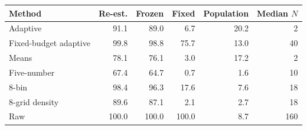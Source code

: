 \begin{tabular}{lrrrrr}\toprule Method & Re-est. & Frozen & Fixed & Population & Median $N$\\\midrule
Adaptive & 91.1 & 89.0 & 6.7 & 20.2 & 2\\
Fixed-budget adaptive & 99.8 & 98.8 & 75.7 & 13.0 & 40\\
Means & 78.1 & 76.1 & 3.0 & 17.2 & 2\\
Five-number & 67.4 & 64.7 & 0.7 & 1.6 & 10\\
8-bin & 98.4 & 96.3 & 17.6 & 7.6 & 18\\
8-grid density & 89.6 & 87.1 & 2.1 & 2.7 & 18\\
Raw & 100.0 & 100.0 & 100.0 & 8.7 & 160\\
\bottomrule\end{tabular}